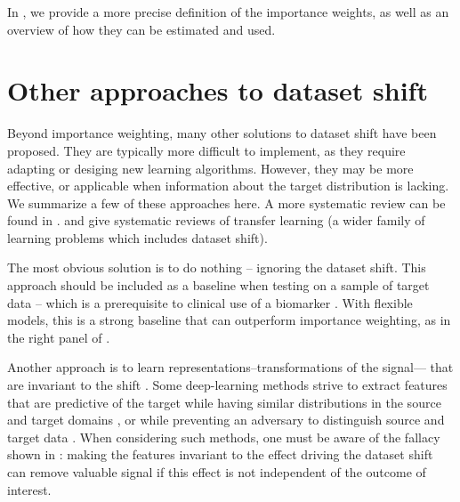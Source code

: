 \documentclass[twocolumn]{article}
\newcommand{\eg}{e.g.\,}
\begin{document}
In , we provide a more precise definition of
the importance weights, as well as an overview of how they can be estimated and
used.

\section{Other approaches to dataset shift}
Beyond importance weighting, many other solutions to dataset shift have been proposed.
%
They are typically more difficult to implement, as they require adapting or desiging new learning algorithms.
However, they may be more effective, or applicable when information about the target distribution is lacking.
We summarize a few of these approaches here.
A more systematic review can be found in \citet{kouw2019review}.
 and \citet{pan2009survey} give systematic reviews of transfer learning (a wider family of learning problems which includes dataset shift).
%

The most obvious solution is to do nothing -- ignoring the dataset shift.
This approach should be included as a baseline when testing on a sample of target data -- which is a prerequisite to clinical use of a biomarker \citep{storkey2009training,woo2017building}.
With flexible models, this is a strong baseline that can outperform
importance weighting, as in the right panel of .
%

%
Another approach is to learn representations--transformations of the
signal--- that are invariant to the shift \citep{achille2018emergence}.
Some deep-learning methods strive to extract features that are predictive
of the target while having similar distributions in the source and target
domains \citep[\eg][]{long2015learning}, or while preventing an adversary to distinguish source and target data \citep[``domain-adversarial'' learning, \eg][]{tzeng2017adversarial}.
When considering such methods, one must be aware of the fallacy shown in
: making the features invariant to the effect driving the dataset shift can
remove valuable signal if this effect is not independent of the outcome
of interest.

\end{document}
